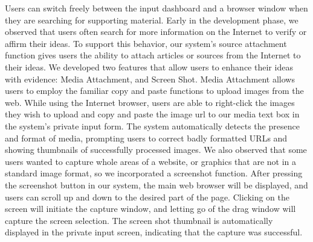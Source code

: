 \documentclass{sigchi}
\begin{document}
Users can switch freely between the input dashboard and a browser window when they are searching for supporting material.  Early in the development phase, we observed that users often search for more information on the Internet to verify or affirm  their ideas. To support this behavior, our system's source attachment function gives users the ability to attach articles or sources from the Internet to their ideas. We developed two features that allow users to enhance their ideas with evidence: Media Attachment, and Screen Shot. Media Attachment allows users to employ the familiar copy and paste functions to upload images from the web. While using the Internet browser, users are able to right-click the images they wish to upload and copy and paste the image url to our media text box in the system's private input form. The system automatically detects the presence and format of media, prompting users to correct badly formatted URLs and showing thumbnails of successfully processed images. We also observed that some users wanted to capture whole areas of a website, or graphics that are not in a standard image format, so we incorporated a screenshot function. After pressing the screenshot button in our system, the main web browser will be displayed, and users can scroll up and down to the desired part of the page. Clicking on the screen will initiate the capture window, and letting go of the drag window will capture the screen selection. The screen shot thumbnail is automatically displayed in the private input screen, indicating that the capture was successful. 
\end{document}
